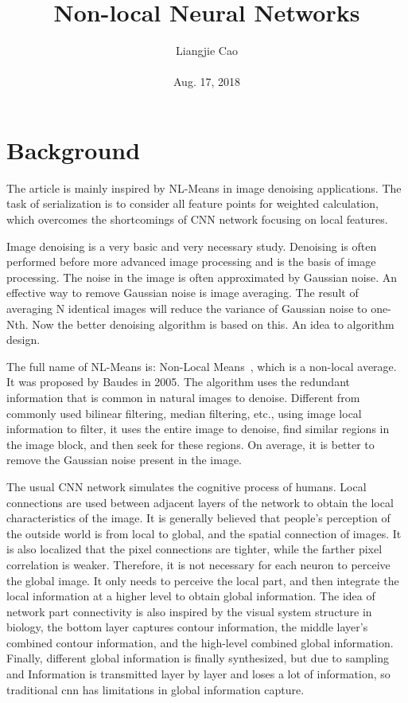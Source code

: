 \documentclass[10pt,twocolumn,letterpaper]{article}
\begin{document}
\title{\textbf{Non-local Neural Networks}}
\author{Liangjie Cao\\\\ Aug. 17, 2018}
\maketitle
\section{Background}
The article is mainly inspired by NL-Means in image denoising applications. The task of serialization is to consider all feature points for weighted calculation, which overcomes the shortcomings of CNN network focusing on local features.
\par Image denoising is a very basic and very necessary study. Denoising is often performed before more advanced image processing and is the basis of image processing. The noise in the image is often approximated by Gaussian noise. An effective way to remove Gaussian noise is image averaging. The result of averaging N identical images will reduce the variance of Gaussian noise to one-Nth. Now the better denoising algorithm is based on this. An idea to algorithm design.
\par The full name of NL-Means is: Non-Local Means~\cite{name20}, which is a non-local average. It was proposed by Baudes in 2005. The algorithm uses the redundant information that is common in natural images to denoise. Different from commonly used bilinear filtering, median filtering, etc., using image local information to filter, it uses the entire image to denoise, find similar regions in the image block, and then seek for these regions. On average, it is better to remove the Gaussian noise present in the image.
\par The usual CNN network simulates the cognitive process of humans. Local connections are used between adjacent layers of the network to obtain the local characteristics of the image. It is generally believed that people's perception of the outside world is from local to global, and the spatial connection of images. It is also localized that the pixel connections are tighter, while the farther pixel correlation is weaker. Therefore, it is not necessary for each neuron to perceive the global image. It only needs to perceive the local part, and then integrate the local information at a higher level to obtain global information. The idea of network part connectivity is also inspired by the visual system structure in biology, the bottom layer captures contour information, the middle layer's combined contour information, and the high-level combined global information. Finally, different global information is finally synthesized, but due to sampling and Information is transmitted layer by layer and loses a lot of information, so traditional cnn has limitations in global information capture.
\end{document}
